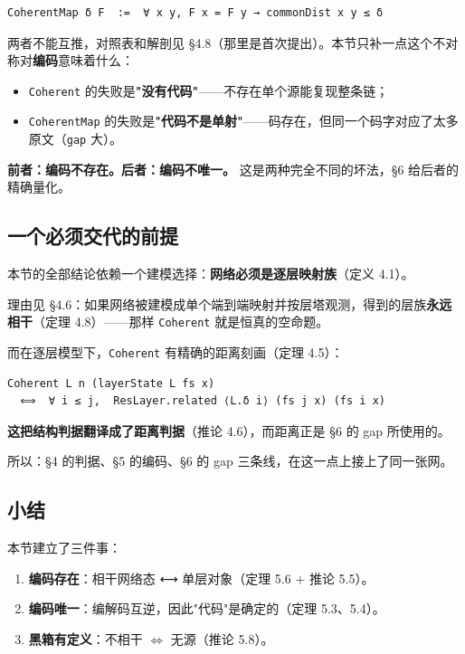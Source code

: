 \documentclass[11pt,a4paper]{ctexart}
\begin{document}
\begin{lstlisting}
CoherentMap δ F  :=  ∀ x y, F x = F y → commonDist x y ≤ δ
\end{lstlisting}

两者不能互推，对照表和解剖见 §4.8（那里是首次提出）。本节只补一点这个不对称对\textbf{编码}意味着什么：

\begin{itemize}
\item \texttt{Coherent} 的失败是\textbf{"没有代码"}——不存在单个源能复现整条链；
\item \texttt{CoherentMap} 的失败是\textbf{"代码不是单射"}——码存在，但同一个码字对应了太多原文（\texttt{gap} 大）。
\end{itemize}

\textbf{前者：编码不存在。后者：编码不唯一。} 这是两种完全不同的坏法，§6 给后者的精确量化。

\subsection{一个必须交代的前提}

本节的全部结论依赖一个建模选择：\textbf{网络必须是逐层映射族}（定义 4.1）。

理由见 §4.6：如果网络被建模成单个端到端映射并按层塔观测，得到的层族\textbf{永远相干}（定理 4.8）——那样 \texttt{Coherent} 就是恒真的空命题。

而在逐层模型下，\texttt{Coherent} 有精确的距离刻画（定理 4.5）：

\begin{lstlisting}
Coherent L n (layerState L fs x)
  ⟺  ∀ i ≤ j,  ResLayer.related ⟨L.δ i⟩ (fs j x) (fs i x)
\end{lstlisting}

\textbf{这把结构判据翻译成了距离判据}（推论 4.6），而距离正是 §6 的 gap 所使用的。

所以：§4 的判据、§5 的编码、§6 的 gap 三条线，在这一点上接上了同一张网。

\subsection{小结}

本节建立了三件事：

\begin{enumerate}
\item \textbf{编码存在}：相干网络态 ⟷ 单层对象（定理 5.6 + 推论 5.5）。
\item \textbf{编码唯一}：编解码互逆，因此"代码"是确定的（定理 5.3、5.4）。
\item \textbf{黑箱有定义}：不相干 \ensuremath{\Longleftrightarrow} 无源（推论 5.8）。
\end{enumerate}
\end{document}
